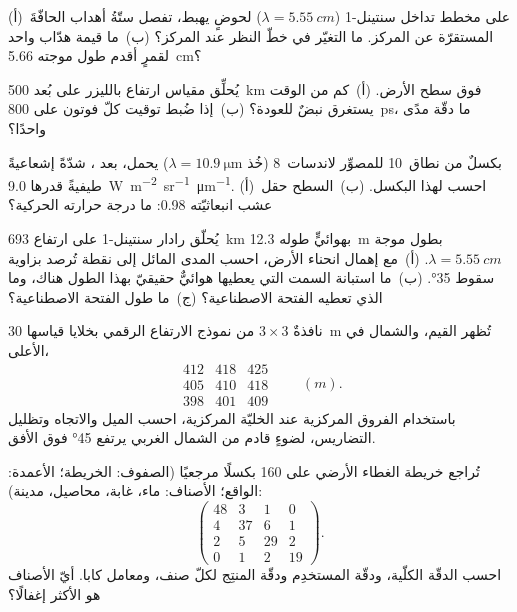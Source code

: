 \begin{exercise}[$\star$]\label{exo:b3:remote-sensing-gis:3}
(أ)~على مخطط تداخل سنتينل-1 ($\lambda = \qty{5.55}{cm}$) لحوضٍ يهبط،
تفصل ستّةُ أهداب الحافّةَ المستقرّة عن المركز.
ما التغيّر في خطّ النظر عند المركز؟ (ب)~ما قيمة هدّاب واحد
لقمرٍ أقدم طول موجته \qty{5.66}{cm}؟
\end{exercise}

\begin{exercise}[$\star$]\label{exo:b3:remote-sensing-gis:4}
يُحلِّق مقياس ارتفاع بالليزر على بُعد \qty{500}{km} فوق سطح الأرض. (أ)~كم من الوقت يستغرق نبضٌ
للعودة؟ (ب)~إذا ضُبط توقيت كلّ فوتون على \qty{800}{ps}، ما دقّة
مدًى واحدًا؟
\end{exercise}

\begin{exercise}[$\star\star$]\label{exo:b3:remote-sensing-gis:5}
بكسلٌ من نطاق~10 للمصوِّر لاندسات~8 (خُذ $\lambda = \qty{10.9}{\micro\metre}$)
يحمل، بعد ، شدّةً إشعاعيةً طيفيةً قدرها
\qty{9.0}{W.m^{-2}.sr^{-1}.\micro\metre^{-1}}. (أ)~احسب 
لهذا البكسل. (ب)~السطح حقل عشب انبعاثيّته 0.98:
ما درجة حرارته الحركية؟
\end{exercise}

\begin{exercise}[$\star\star$]\label{exo:b3:remote-sensing-gis:6}
يُحلّق رادار سنتينل-1 على ارتفاع \qty{693}{km} بهوائيٍّ طوله \qty{12.3}{m}
بطول موجة $\lambda = \qty{5.55}{cm}$. (أ)~مع إهمال انحناء
الأرض، احسب المدى المائل إلى نقطة تُرصد بزاوية سقوط
\ang{35}. (ب)~ما استبانة السمت التي يعطيها هوائيٌّ حقيقيّ بهذا الطول هناك،
وما الذي تعطيه الفتحة الاصطناعية؟ (ج)~ما طول
الفتحة الاصطناعية؟
\end{exercise}

\begin{exercise}[$\star\star$]\label{exo:b3:remote-sensing-gis:7}
نافذةٌ $3\times3$ من نموذج الارتفاع الرقمي بخلايا قياسها \qty{30}{m}
تُظهر القيم، والشمال في الأعلى،
\[
\begin{matrix} 412 & 418 & 425 \\ 405 & 410 & 418 \\ 398 & 401 & 409 \end{matrix}
\qquad (\unit{m}).
\]
باستخدام الفروق المركزية عند الخليّة المركزية، احسب الميل والاتجاه
وتظليل التضاريس، لضوءٍ قادم من الشمال الغربي يرتفع \ang{45} فوق
الأفق.
\end{exercise}

\begin{exercise}[$\star\star$]\label{exo:b3:remote-sensing-gis:8}
تُراجع خريطة الغطاء الأرضي على 160 بكسلًا مرجعيًا (الصفوف: الخريطة؛
الأعمدة: الواقع؛ الأصناف: ماء، غابة، محاصيل، مدينة):
\[
\begin{pmatrix} 48 & 3 & 1 & 0 \\ 4 & 37 & 6 & 1 \\ 2 & 5 & 29 & 2 \\ 0 & 1 & 2 & 19 \end{pmatrix} .
\]
احسب الدقّة الكلّية، ودقّة المستخدِم ودقّة المنتِج لكلّ
صنف، ومعامل كابا. أيّ الأصناف هو الأكثر إغفالًا؟
\end{exercise}

